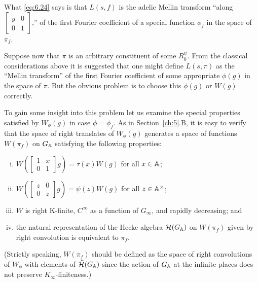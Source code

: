What \eqref{eq:6.24} says is that $L(s, f)$ is the adelic Mellin transform ``along $\begin{bmatrix} y & 0 \\ 0 & 1 \end{bmatrix}$,'' of the first Fourier coefficient of a special function $\phi_f$ in the space of $\pi_f$.

Suppose now that $\pi$ is an arbitrary constituent of some $R_0^{\psi}$. From the classical considerations above it is suggested that one might define $L(s, \pi)$ as the ``Mellin transform'' of the first Fourier coefficient of some appropriate $\phi(g)$ in the space of $\pi$. But the obvious problem is to choose this $\phi(g)$ or $W(g)$ correctly.

To gain some insight into this problem let us examine the special properties satisfied by $W_{\phi}(g)$ in case $\phi = \phi_f$. As in Section~\ref{ch:5}.B, it is easy to verify that the space of right translates of $W_{\phi}(g)$ generates a space of functions $W(\pi_f)$ on $G_{\mathbb{A}}$ satisfying the following properties:

\begin{enumerate}[(i)]

\item $W\!\left(\begin{bmatrix} 1 & x \\ 0 & 1 \end{bmatrix} g\right) = \tau(x)W(g)$ for all $x \in \mathbb{A}$;

\item $W\!\left(\begin{bmatrix} z & 0 \\ 0 & z \end{bmatrix} g\right) = \psi(z)W(g)$ for all $z \in \mathbb{A}^{\times}$;

\item $W$ is right K-finite, $C^{\infty}$ as a function of $G_{\infty}$, and rapidly decreasing; and

\item the natural representation of the Hecke algebra $\mathcal{H}(G_{\mathbb{A}})$ on $W(\pi_f)$ given by right convolution is equivalent to $\pi_f$.

\end{enumerate}

(Strictly speaking, $W(\pi_f)$ should be defined as the space of right convolutions of $W_{\phi}$ with elements of $\tilde{\mathcal{H}}(G_{\mathbb{A}})$ since the action of $G_{\mathbb{A}}$ at the infinite places does not preserve $K_{\infty}$-finiteness.)

